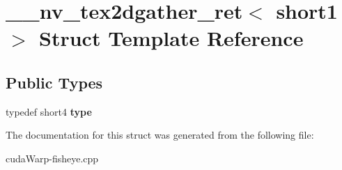\hypertarget{struct____nv__tex2dgather__ret_3_01short1_01_4}{}\section{\+\_\+\+\_\+nv\+\_\+tex2dgather\+\_\+ret$<$ short1 $>$ Struct Template Reference}
\label{struct____nv__tex2dgather__ret_3_01short1_01_4}
\subsection*{Public Types}
\begin{DoxyCompactItemize}
\item 
typedef short4 {\bfseries type}\hypertarget{struct____nv__tex2dgather__ret_3_01short1_01_4_a8e65b5d07273556e65ca4377ff0be177}{}\label{struct____nv__tex2dgather__ret_3_01short1_01_4_a8e65b5d07273556e65ca4377ff0be177}

\end{DoxyCompactItemize}


The documentation for this struct was generated from the following file\+:\begin{DoxyCompactItemize}
\item 
cuda\+Warp-\/fisheye.\+cpp\end{DoxyCompactItemize}
